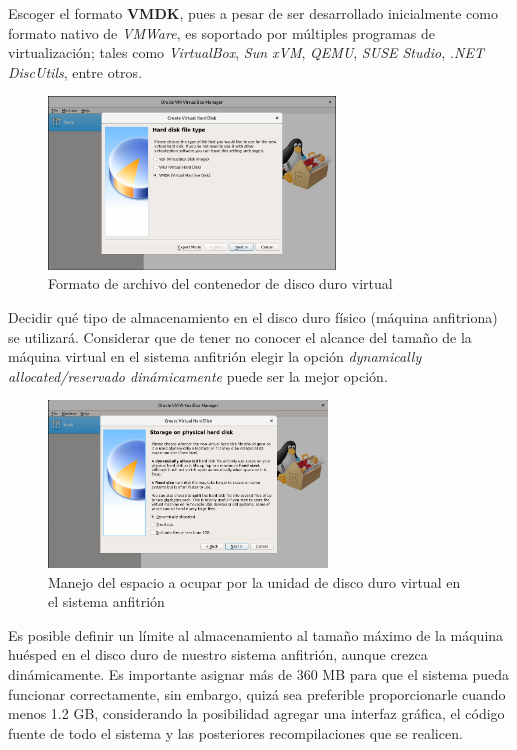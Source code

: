 \documentclass[12pt]{scrartcl}
\begin{document}
Escoger el formato \textbf{VMDK}, pues a pesar de ser desarrollado inicialmente como formato nativo de \textit{VMWare}, es soportado por múltiples
programas de virtualización; tales como \textit{VirtualBox}, \textit{Sun xVM}, \textit{QEMU}, \textit{SUSE Studio}, \textit{.NET DiscUtils}, entre otros.
\begin{figure}[H]
  \centering
  \includegraphics[width=0.68\textwidth]{vb/4.png}
  \caption{Formato de archivo del contenedor de disco duro virtual }
\end{figure}
\newpage
Decidir qué tipo de almacenamiento en el disco duro físico (máquina anfitriona) se utilizará. Considerar que de tener no conocer el alcance del tamaño de la máquina virtual en el sistema anfitrión elegir la opción \textit{dynamically allocated/reservado dinámicamente} puede ser la mejor opción.  
\begin{figure}[H]
  \centering
  \includegraphics[width=0.66\textwidth]{vb/5.png}
  \caption{Manejo del espacio a ocupar por la unidad de disco duro virtual en el sistema anfitrión}
\end{figure}

Es posible definir un límite al almacenamiento al tamaño máximo de la máquina huésped en el disco duro de nuestro sistema anfitrión, aunque crezca dinámicamente.
Es importante asignar más de 360 MB para que el sistema pueda funcionar correctamente, sin embargo, quizá sea preferible proporcionarle cuando menos 1.2 GB, considerando la posibilidad agregar una interfaz gráfica, el código fuente de todo el sistema y las posteriores recompilaciones que se realicen.
\end{document}

